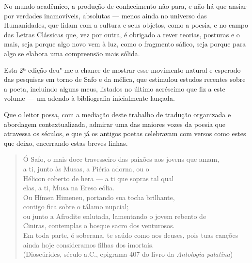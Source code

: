 No mundo acadêmico, a produção de conhecimento não para, e não há que
ansiar por verdades inamovíveis, absolutas --- menos ainda no universo
das Humanidades, que lidam com a cultura e seus objetos, como a poesia,
e no campo das Letras Clássicas que, vez por outra, é obrigado a rever
teorias, posturas e o mais, seja porque algo novo vem à luz, como o
fragmento sáfico, seja porque para algo se elabora uma compreensão mais
sólida.

Esta 2ª edição deu"-me a chance de mostrar esse movimento natural e
esperado das pesquisas em torno de Safo e da mélica, que estimulou
estudos recentes sobre a poeta, incluindo alguns meus, listados no
último acréscimo que fiz a este volume --- um adendo à bibliografia
inicialmente lançada.

Que o leitor possa, com a mediação deste trabalho de tradução organizada
e abordagem contextualizada, admirar uma das maiores vozes da poesia que
atravessa os séculos, e que já os antigos poetas celebravam com versos
como estes que deixo, encerrando estas breves linhas.

\begin{verse}
Ó Safo, o mais doce travesseiro das paixões \qb{}aos jovens que amam,\\
a ti, junto às Musas, a Piéria adorna, ou o\\
Hélicon coberto de hera --- a ti que sopras tal \qb{}qual\\
elas, a ti, Musa na Ereso eólia.\\
Ou Hímen Himeneu, portando sua tocha \qb{}brilhante,\\
contigo fica sobre o tálamo nupcial;\\
ou junto a Afrodite enlutada, lamentando o \qb{}jovem rebento de\\
Ciniras, contemplas o bosque sacro dos \qb{}venturosos.\\
Em toda parte, ó soberana, te saúdo como aos \qb{}deuses, pois tuas canções\\
ainda hoje consideramos filhas dos imortais.\\[5pt]
(Dioscúrides, século  a.C., epigrama 407 do livro  da
\emph{Antologia palatina})
\end{verse}
